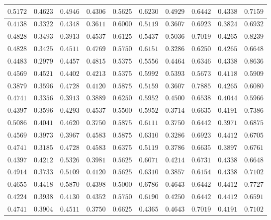 \begin{longtable}{c|c|c|c|c|c|c|c|c|c}
    $0.5172$ & $0.4623$ & $0.4946$ & $0.4306$ & $0.5625$ & $0.6230$ & $0.4929$ & $0.6442$ & $0.4338$ & $0.7159$ \\ \hline
    $0.4138$ & $0.3322$ & $0.4348$ & $0.3611$ & $0.6000$ & $0.5119$ & $0.3607$ & $0.6923$ & $0.3824$ & $0.6932$ \\ \hline
    $0.4828$ & $0.3493$ & $0.3913$ & $0.4537$ & $0.6125$ & $0.5437$ & $0.5036$ & $0.7019$ & $0.4265$ & $0.8239$ \\ \hline
    $0.4828$ & $0.3425$ & $0.4511$ & $0.4769$ & $0.5750$ & $0.6151$ & $0.3286$ & $0.6250$ & $0.4265$ & $0.6648$ \\ \hline
    $0.4483$ & $0.2979$ & $0.4457$ & $0.4815$ & $0.5375$ & $0.5556$ & $0.4464$ & $0.6346$ & $0.4338$ & $0.8636$ \\ \hline
    $0.4569$ & $0.4521$ & $0.4402$ & $0.4213$ & $0.5375$ & $0.5992$ & $0.5393$ & $0.5673$ & $0.4118$ & $0.5909$ \\ \hline
    $0.3879$ & $0.3596$ & $0.4728$ & $0.4120$ & $0.5875$ & $0.5159$ & $0.3607$ & $0.7885$ & $0.4265$ & $0.6080$ \\ \hline
    $0.4741$ & $0.3356$ & $0.3913$ & $0.3889$ & $0.6250$ & $0.5952$ & $0.4500$ & $0.6538$ & $0.4044$ & $0.5966$ \\ \hline
    $0.4397$ & $0.3596$ & $0.4293$ & $0.4537$ & $0.5500$ & $0.5952$ & $0.3714$ & $0.6635$ & $0.4191$ & $0.7386$ \\ \hline
    $0.5086$ & $0.4041$ & $0.4620$ & $0.3750$ & $0.5875$ & $0.6111$ & $0.3750$ & $0.6442$ & $0.3971$ & $0.6875$ \\ \hline
    $0.4569$ & $0.3973$ & $0.3967$ & $0.4583$ & $0.5875$ & $0.6310$ & $0.3286$ & $0.6923$ & $0.4412$ & $0.6705$ \\ \hline
    $0.4741$ & $0.3185$ & $0.4728$ & $0.4583$ & $0.6375$ & $0.5119$ & $0.3786$ & $0.6635$ & $0.3897$ & $0.6761$ \\ \hline
    $0.4397$ & $0.4212$ & $0.5326$ & $0.3981$ & $0.5625$ & $0.6071$ & $0.4214$ & $0.6731$ & $0.4338$ & $0.6648$ \\ \hline
    $0.4914$ & $0.3733$ & $0.5109$ & $0.4120$ & $0.5625$ & $0.6310$ & $0.3857$ & $0.6154$ & $0.4338$ & $0.7102$ \\ \hline
    $0.4655$ & $0.4418$ & $0.5870$ & $0.4398$ & $0.5000$ & $0.6786$ & $0.4643$ & $0.6442$ & $0.4412$ & $0.7727$ \\ \hline
    $0.4224$ & $0.3938$ & $0.4130$ & $0.4352$ & $0.5750$ & $0.6190$ & $0.4250$ & $0.6442$ & $0.4412$ & $0.6591$ \\ \hline
    $0.4741$ & $0.3904$ & $0.4511$ & $0.3750$ & $0.6625$ & $0.4365$ & $0.4643$ & $0.7019$ & $0.4191$ & $0.7102$ \\ \hline

\end{longtable}
